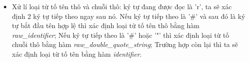 \begin{itemize}




  \item Xử lí loại từ tố tên thô và chuỗi thô: ký tự đang được đọc là 'r', ta sẽ xác định 2 ký tự tiếp theo ngay sau nó. Nếu ký tự tiếp theo là '\#' và sau đó là ký tự bắt đầu tên hợp lệ thì xác định loại từ tố tên thô bằng hàm \textit{raw\_identifier}; Nếu ký tự tiếp theo là '\#' hoặc '"' thì xác định loại từ tố chuỗi thô bằng hàm \textit{raw\_double\_quote\_string}; Trường hợp còn lại thì ta sẽ xác định loại từ tố tên bằng hàm \textit{identifier.}


\end{itemize}
